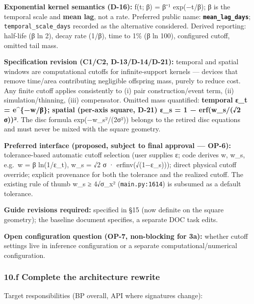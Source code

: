 \documentclass[
  10pt,
]{article}
\begin{document}
\textbf{Exponential kernel semantics (D-16):} f(t; β) = β⁻¹ exp(−t/β); β is the temporal scale and \textbf{mean lag}, not a rate. Preferred public name: \textbf{\texttt{mean\_lag\_days}}; \texttt{temporal\_scale\_days} recorded as the alternative considered. Derived reporting: half-life (β ln 2), decay rate (1/β), time to 1\% (β ln 100), configured cutoff, omitted tail mass.

\textbf{Specification revision (C1/C2, D-13/D-14/D-21):} temporal and spatial windows are computational cutoffs for infinite-support kernels --- devices that remove time/area contributing negligible offspring mass, purely to reduce cost. Any finite cutoff applies consistently to (i) pair construction/event term, (ii) simulation/thinning, (iii) compensator. Omitted mass quantified: \textbf{temporal ε\_t = e\^{}\{−w/β\}; spatial (per-axis square, D-21) ε\_s = 1 − erf(w\_s/(√2 σ))²}. The disc formula exp(−w\_s²/(2σ²)) belongs to the retired disc equations and must never be mixed with the square geometry.

\textbf{Preferred interface (proposed, subject to final approval --- OP-6):} tolerance-based automatic cutoff selection (user supplies ε; code derives w, w\_s, e.g.~w = β ln(1/ε\_t), w\_s = √2 σ · erfinv(√(1−ε\_s))); direct physical cutoff override; explicit provenance for both the tolerance and the realized cutoff. The existing rule of thumb w\_s ≥ 4√σ\_x² (\texttt{main.py:1614}) is subsumed as a default tolerance.

\textbf{Guide revisions required:} specified in §15 (now definite on the square geometry); the baseline document specifies, a separate DOC task edits.

\textbf{Open configuration question (OP-7, non-blocking for 3a):} whether cutoff settings live in inference configuration or a separate computational/numerical configuration.

\hypertarget{f-complete-the-architecture-rewrite}{%
\subsubsection{10.f Complete the architecture rewrite}\label{f-complete-the-architecture-rewrite}}

Target responsibilities (BP overall, API where signatures change):
\end{document}
